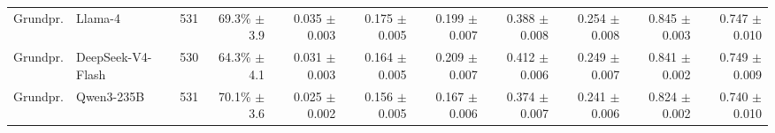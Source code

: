\begin{table}[t]
{\begin{tabular}{llrrrrrrrrr}
Grundpr. & Llama-4 & 531 & \shortstack[r]{69.3\%\\{\scriptsize $\pm$3.9}} & \shortstack[r]{0.035\\{\scriptsize $\pm$0.003}} & \shortstack[r]{0.175\\{\scriptsize $\pm$0.005}} & \shortstack[r]{0.199\\{\scriptsize $\pm$0.007}} & \shortstack[r]{0.388\\{\scriptsize $\pm$0.008}} & \shortstack[r]{0.254\\{\scriptsize $\pm$0.008}} & \shortstack[r]{0.845\\{\scriptsize $\pm$0.003}} & \shortstack[r]{0.747\\{\scriptsize $\pm$0.010}} \\
Grundpr. & DeepSeek-V4-Flash & 530 & \shortstack[r]{64.3\%\\{\scriptsize $\pm$4.1}} & \shortstack[r]{0.031\\{\scriptsize $\pm$0.003}} & \shortstack[r]{0.164\\{\scriptsize $\pm$0.005}} & \shortstack[r]{0.209\\{\scriptsize $\pm$0.007}} & \shortstack[r]{0.412\\{\scriptsize $\pm$0.006}} & \shortstack[r]{0.249\\{\scriptsize $\pm$0.007}} & \shortstack[r]{0.841\\{\scriptsize $\pm$0.002}} & \shortstack[r]{0.749\\{\scriptsize $\pm$0.009}} \\
Grundpr. & Qwen3-235B & 531 & \shortstack[r]{70.1\%\\{\scriptsize $\pm$3.6}} & \shortstack[r]{0.025\\{\scriptsize $\pm$0.002}} & \shortstack[r]{0.156\\{\scriptsize $\pm$0.005}} & \shortstack[r]{0.167\\{\scriptsize $\pm$0.006}} & \shortstack[r]{0.374\\{\scriptsize $\pm$0.007}} & \shortstack[r]{0.241\\{\scriptsize $\pm$0.006}} & \shortstack[r]{0.824\\{\scriptsize $\pm$0.002}} & \shortstack[r]{0.740\\{\scriptsize $\pm$0.010}} \\
\bottomrule
\end{tabular}
}%
\end{table}
